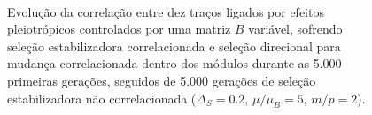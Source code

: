 \begin{figure}[htbp]
  \vspace{-18pt}
  \vspace{11pt}
  \\
  \caption{Evolução da correlação entre dez traços ligados por efeitos
  pleiotrópicos controlados por uma matriz $B$ variável, sofrendo
  seleção estabilizadora correlacionada e seleção direcional para
  mudança correlacionada dentro dos módulos durante as 5.000
  primeiras gerações, seguidos de 5.000 gerações de seleção
  estabilizadora não correlacionada ($\Delta_S = 0.2$, $\mu/\mu_B=5$,
  $m/p=2$).}
  \label{posselecaoSemEstab}
\end{figure}



